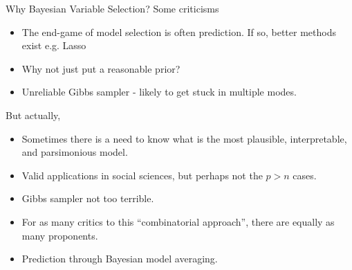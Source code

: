 \documentclass[]{beamer}\usepackage[]{graphicx}\usepackage[]{color}
\begin{document}
\begin{frame}{Why Bayesian Variable Selection?}
	Some criticisms
	\begin{itemize}
		\item The end-game of model selection is often prediction. If so, better methods exist e.g. Lasso
		\item Why not just put a reasonable prior?
		\item Unreliable Gibbs sampler - likely to get stuck in multiple modes.
	\end{itemize}

	\pause

	But actually,
	\begin{itemize}
		\item Sometimes there is a need to know what is the most plausible, interpretable, and parsimonious model.
		\item Valid applications in social sciences, but perhaps not the $p > n$ cases.
		\item Gibbs sampler not too terrible.
		\item For as many critics to this ``combinatorial approach'', there are equally as many proponents.
		\item Prediction through Bayesian model averaging.
	\end{itemize}
\end{frame}
\end{document}
